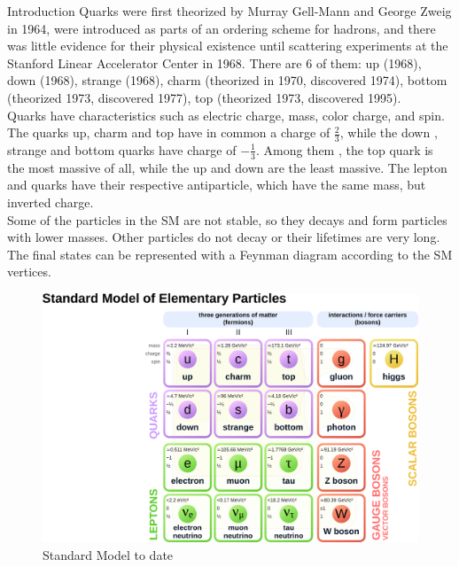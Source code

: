 \begin{chapter}{Introduction}
Quarks were first theorized by Murray Gell-Mann and 
George Zweig in 1964, were introduced as parts of an ordering scheme for hadrons, and there was little evidence for their physical existence until scattering experiments at the Stanford Linear Accelerator Center in 1968\cite{griff}.
There are 6 of them: up (1968), down (1968), strange (1968), charm (theorized in 1970, discovered 1974), bottom (theorized 1973, discovered 1977), top (theorized 1973, discovered 1995).
\\

Quarks have characteristics such as  electric charge, mass, color charge, and spin. The quarks up, charm and top have in common a charge of $\frac{2}{3}$, while the down , strange and bottom quarks have charge of $-\frac{1}{3}$. Among them , the top quark is the most massive of all, while the up and down are the least massive. 
The lepton and quarks have their respective antiparticle, which have the same mass, but inverted charge.\\  
Some of the particles in the SM are not stable, so they decays and form particles with lower masses. Other particles do not decay or their lifetimes are very long. The final states can be represented with a Feynman diagram according to the SM vertices\cite{mark}.

\begin{center}
    \begin{figure}[!htbp]
        \centering
        \includegraphics[scale=0.3]{Chapter1/sm1.png}
        \caption{Standard Model to date \protect \footnotemark}
        \label{sm1}
    \end{figure}
\end{center}


\end{chapter}
